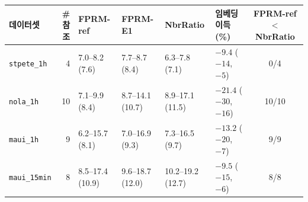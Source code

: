\begin{tabular}{lrllllc}
\toprule
데이터셋 & \#참조 & FPRM-ref & FPRM-E1 & NbrRatio & 임베딩 이득 (\%) & FPRM-ref $<$ NbrRatio \\
\midrule
\texttt{stpete\_1h} & 4 & 7.0--8.2 (7.6) & 7.7--8.7 (8.4) & 6.3--7.8 (7.1) & $-9.4$ ($-14$, $-5$) & 0/4 \\
\texttt{nola\_1h} & 10 & 7.1--9.9 (8.4) & 8.7--14.1 (10.7) & 8.9--17.1 (11.5) & $-21.4$ ($-30$, $-16$) & 10/10 \\
\texttt{maui\_1h} & 9 & 6.2--15.7 (8.1) & 7.0--16.9 (9.3) & 7.3--16.5 (9.7) & $-13.2$ ($-20$, $-7$) & 9/9 \\
\texttt{maui\_15min} & 8 & 8.5--17.4 (10.9) & 9.6--18.7 (12.0) & 10.2--19.2 (12.7) & $-9.5$ ($-15$, $-6$) & 8/8 \\
\bottomrule
\end{tabular}
